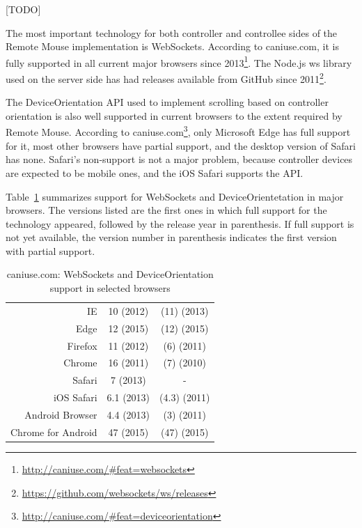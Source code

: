 \documentclass[a4paper,english,twocolumn]{article}
\newcommand*\rot{\rotatebox{90}}
\begin{document}
[TODO]

The most important technology for both controller and controllee sides
of the Remote Mouse implementation is WebSockets. According to
caniuse.com, it is fully supported in all current major browsers since
2013\footnote{\url{http://caniuse.com/#feat=websockets}}. The Node.js
ws library used on the server side has had releases available from
GitHub since
2011\footnote{\url{https://github.com/websockets/ws/releases}}.

The DeviceOrientation API used to implement scrolling based on
controller orientation is also well supported in current browsers to
the extent required by Remote Mouse. According to
caniuse.com\footnote{\url{http://caniuse.com/#feat=deviceorientation}},
only Microsoft Edge has full support for it, most other browsers have
partial support, and the desktop version of Safari has none. Safari's
non-support is not a major problem, because controller devices are
expected to be mobile ones, and the iOS Safari supports the API.

Table~\ref{table:caniuse} summarizes support for WebSockets and
DeviceOrientetation in major browsers. The versions listed are the
first ones in which full support for the technology appeared, followed
by the release year in parenthesis. If full support is not yet
available, the version number in parenthesis indicates the first
version with partial support.

\begin{table} \centering
  \begin{tabular}{rcc}
    & \rot{WebSockets} & \rot{DeviceOrientation} \\
    \hline
    IE & 10 (2012) & (11) (2013) \\
    Edge & 12 (2015) & (12) (2015) \\
    Firefox & 11 (2012) & (6) (2011) \\
    Chrome & 16 (2011) & (7) (2010) \\
    Safari & 7 (2013) & - \\
    iOS Safari & 6.1 (2013) & (4.3) (2011) \\
    Android Browser & 4.4 (2013) & (3) (2011) \\
    Chrome for Android & 47 (2015) & (47) (2015) \\
    \hline
  \end{tabular}
  \caption{caniuse.com: WebSockets and DeviceOrientation support in selected browsers}
  \label{table:caniuse}
\end{table}
\end{document}
